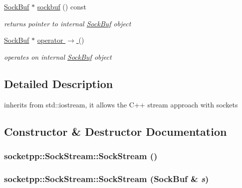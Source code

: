 \begin{CompactItemize}
\hyperlink{classsocketpp_1_1SockBuf}{SockBuf} $\ast$ \hyperlink{classsocketpp_1_1SockStream_4b14a0ce8d640deb5f5bd64807c7b68d}{sockbuf} () const 
\begin{CompactList}\small\item\em returns pointer to internal \hyperlink{classsocketpp_1_1SockBuf}{SockBuf} object \item\end{CompactList}\item 
\hyperlink{classsocketpp_1_1SockBuf}{SockBuf} $\ast$ \hyperlink{classsocketpp_1_1SockStream_c5509fd039943c07c4506e42c75605e3}{operator $\rightarrow$ } ()
\begin{CompactList}\small\item\em operates on internal \hyperlink{classsocketpp_1_1SockBuf}{SockBuf} object \item\end{CompactList}\end{CompactItemize}


\subsection{Detailed Description}
inherits from std::iostream, it allows the C++ stream approach with sockets 

\subsection{Constructor \& Destructor Documentation}
\hypertarget{classsocketpp_1_1SockStream_562a217e536c888c569fde2c9031c94d}{
\subsubsection[{SockStream}]{\setlength{\rightskip}{0pt plus 5cm}socketpp::SockStream::SockStream ()}}
\label{classsocketpp_1_1SockStream_562a217e536c888c569fde2c9031c94d}


\hypertarget{classsocketpp_1_1SockStream_11fbfc7bda45c178c6e09ac6d67512fd}{
\subsubsection[{SockStream}]{\setlength{\rightskip}{0pt plus 5cm}socketpp::SockStream::SockStream ({\bf SockBuf} \& {\em s})}}
\label{classsocketpp_1_1SockStream_11fbfc7bda45c178c6e09ac6d67512fd}



